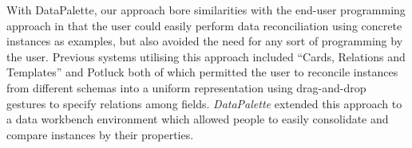 \documentclass{sigchi}
\begin{document}
With DataPalette, our approach bore similarities with the end-user programming approach in that the user could easily perform data reconciliation using concrete instances as examples, but also avoided the need for any sort of programming by the user.  Previous systems utilising this approach included ``Cards, Relations and Templates'' \cite{Dontcheva:2007:RCS:1294211.1294224} and Potluck \cite{citeulike:3875264} both of which permitted the user to reconcile instances from different schemas into a uniform representation using drag-and-drop gestures to specify relations among fields.  \emph{DataPalette} extended this approach to a data workbench environment which allowed people to easily consolidate and compare instances by their properties.






\end{document}

